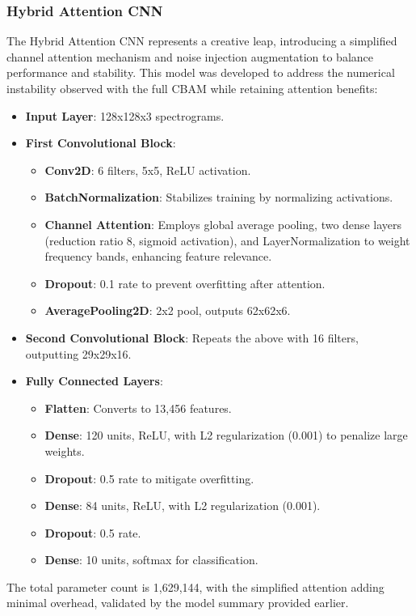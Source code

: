 \documentclass[12pt]{article}
\begin{document}
\subsubsection{Hybrid Attention CNN}
The Hybrid Attention CNN represents a creative leap, introducing a simplified channel attention mechanism and noise injection augmentation to balance performance and stability. This model was developed to address the numerical instability observed with the full CBAM while retaining attention benefits:
\begin{itemize}
    \item \textbf{Input Layer}: 128x128x3 spectrograms.
    \item \textbf{First Convolutional Block}:
        \begin{itemize}
            \item \textbf{Conv2D}: 6 filters, 5x5, ReLU activation.
            \item \textbf{BatchNormalization}: Stabilizes training by normalizing activations.
            \item \textbf{Channel Attention}: Employs global average pooling, two dense layers (reduction ratio 8, sigmoid activation), and LayerNormalization to weight frequency bands, enhancing feature relevance.
            \item \textbf{Dropout}: 0.1 rate to prevent overfitting after attention.
            \item \textbf{AveragePooling2D}: 2x2 pool, outputs 62x62x6.
        \end{itemize}
    \item \textbf{Second Convolutional Block}: Repeats the above with 16 filters, outputting 29x29x16.
    \item \textbf{Fully Connected Layers}:
        \begin{itemize}
            \item \textbf{Flatten}: Converts to 13,456 features.
            \item \textbf{Dense}: 120 units, ReLU, with L2 regularization (0.001) to penalize large weights.
            \item \textbf{Dropout}: 0.5 rate to mitigate overfitting.
            \item \textbf{Dense}: 84 units, ReLU, with L2 regularization (0.001).
            \item \textbf{Dropout}: 0.5 rate.
            \item \textbf{Dense}: 10 units, softmax for classification.
        \end{itemize}
\end{itemize}
The total parameter count is 1,629,144, with the simplified attention adding minimal overhead, validated by the model summary provided earlier.
\end{document}
